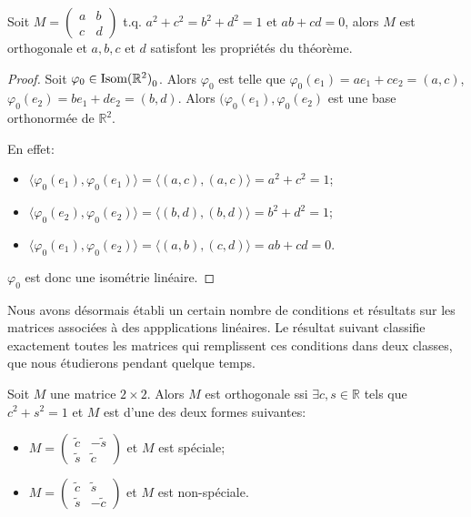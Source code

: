 \documentclass{book}
\numberwithin{equation}{section}
\renewcommand{\phi}{\varphi}
\providecommand{\plan}{{\mathbb R^2}}
\providecommand{\isom}{{\textnormal{Isom}(\plan)}}
\providecommand{\isomo}{{\isom_0}}
\providecommand{\scalaire}[1]{{\langle#1\rangle}}
\begin{document}
\begin{prop}
	Soit $M = \left(\begin{smallmatrix} a&b\\c&d \end{smallmatrix}\right)$ t.q. $a^2 + c^2 = b^2 + d^2 = 1$ et $ab + cd = 0$, alors $M$ est orthogonale et $a, b, c$ et $d$ satisfont les propriétés du théorème.
\end{prop}
\begin{proof}
	Soit $\phi_0 \in \isomo$. Alors $\phi_0$ est telle que $\phi_0(e_1) = ae_1 + ce_2 = (a, c)$, $\phi_0(e_2) = be_1 + de_2 = (b, d)$. Alors $(\phi_0(e_1), \phi_0(e_2)$ est une base orthonormée de $\plan$.\par
	En effet:
	\begin{itemize}
		\item $\scalaire{\phi_0(e_1), \phi_0(e_1)} = \scalaire{(a, c), (a, c)} = a^2 + c^2 = 1$;
		\item $\scalaire{\phi_0(e_2), \phi_0(e_2)} = \scalaire{(b, d), (b, d)} = b^2 + d^2 = 1$;
		\item $\scalaire{\phi_0(e_1), \phi_0(e_2)} = \scalaire{(a, b), (c, d)} = ab + cd = 0$.
	\end{itemize}
	$\phi_0$ est donc une isométrie linéaire.
\end{proof}

Nous avons désormais établi un certain nombre de conditions et résultats sur les matrices associées à des appplications linéaires. Le résultat suivant classifie exactement toutes les matrices qui remplissent ces conditions dans deux classes, que nous étudierons pendant quelque temps.

\begin{prop}
	Soit $M$ une matrice $2 \times 2$. Alors $M$ est orthogonale ssi $\exists c, s \in \mathbb R$ tels que $c^2 + s^2 = 1$ et $M$ est d'une des deux formes suivantes:
	\begin{itemize}
		\item $M = \begin{pmatrix}
			\tilde c &-\tilde s \\ \tilde s & \tilde c
		\end{pmatrix}$ et $M$ est spéciale;
		\item $M = \begin{pmatrix}
			\tilde c & \tilde s \\ \tilde s & -\tilde c
		\end{pmatrix}$ et $M$ est non-spéciale.
	\end{itemize}
\end{prop}
	
\end{document}
